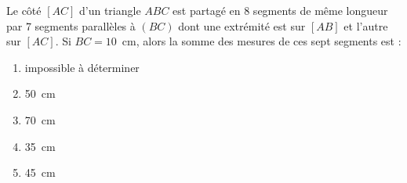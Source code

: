 Le côté $[AC]$ d'un triangle $ABC$ est partagé en 8 segments de même longueur par 7 segments parallèles à $(BC)$ dont une extrémité est sur $[AB]$ et l'autre sur $[AC]$. Si $BC=10$~cm, alors la somme des mesures de ces sept segments est :
\begin{multicols}{2}
  \begin{enumerate}[A/]
  \item impossible à déterminer
  \item 50~cm
  \item 70~cm
  \item 35~cm
  \item 45~cm
  \end{enumerate}
\end{multicols}
